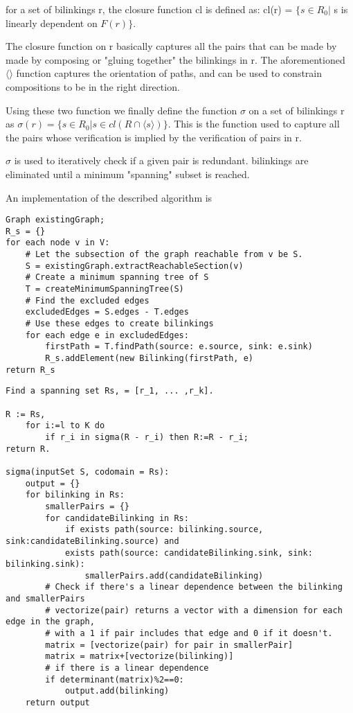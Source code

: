\documentclass[sigplan,review,anonymous]{acmart}
\begin{document}
for a set of bilinkings r, the closure function cl is defined as:
cl(r) = $\{ s\in R_0|$ s is linearly dependent on $F(r) \}$.

The closure function on r basically captures all the pairs that can be made by made by composing or "gluing together" the bilinkings in r. 
The aforementioned $\langle\rangle$ function captures the orientation of paths, and can be used to constrain compositions to be in the right direction. 

Using these two function we finally define the function $\sigma$ on a set of bilinkings r as
$\sigma(r) = \{s \in R_0 | s\in cl(R\cap \langle s \rangle) \}$.
This is the function used to capture all the pairs whose verification is implied by the verification of pairs in r.

$\sigma$ is used to iteratively check if a given pair is redundant. bilinkings are eliminated until a minimum "spanning" subset is reached.

An implementation of the described algorithm is

\begin{verbatim}
Graph existingGraph;
R_s = {}
for each node v in V:
    # Let the subsection of the graph reachable from v be S.
    S = existingGraph.extractReachableSection(v)
    # Create a minimum spanning tree of S
    T = createMinimumSpanningTree(S)
    # Find the excluded edges
    excludedEdges = S.edges - T.edges
    # Use these edges to create bilinkings
    for each edge e in excludedEdges:
        firstPath = T.findPath(source: e.source, sink: e.sink)
        R_s.addElement(new Bilinking(firstPath, e)
return R_s
\end{verbatim}

\begin{verbatim}
Find a spanning set Rs, = [r_1, ... ,r_k].

R := Rs,
    for i:=l to K do
        if r_i in sigma(R - r_i) then R:=R - r_i;
return R.

sigma(inputSet S, codomain = Rs):
    output = {}
    for bilinking in Rs:
        smallerPairs = {}
        for candidateBilinking in Rs:
            if exists path(source: bilinking.source, sink:candidateBilinking.source) and
            exists path(source: candidateBilinking.sink, sink: bilinking.sink):
                smallerPairs.add(candidateBilinking)
        # Check if there's a linear dependence between the bilinking and smallerPairs
        # vectorize(pair) returns a vector with a dimension for each edge in the graph,
        # with a 1 if pair includes that edge and 0 if it doesn't.
        matrix = [vectorize(pair) for pair in smallerPair]
        matrix = matrix+[vectorize(bilinking)]
        # if there is a linear dependence
        if determinant(matrix)%2==0:
            output.add(bilinking)
    return output
                
\end{verbatim}
\end{document}
